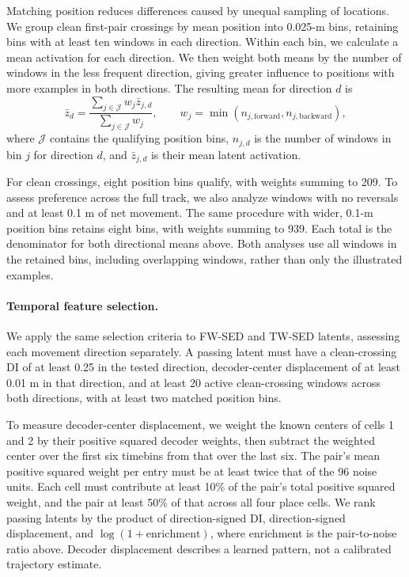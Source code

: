 Matching position reduces differences caused by unequal sampling of locations. We group clean first-pair crossings by mean position into 0.025-m bins, retaining bins with at least ten windows in each direction. Within each bin, we calculate a mean activation for each direction. We then weight both means by the number of windows in the less frequent direction, giving greater influence to positions with more examples in both directions. The resulting mean for direction $d$ is
\begin{equation}
\bar z_d=\frac{\sum_{j\in\mathcal{J}}w_j\bar z_{j,d}}{\sum_{j\in\mathcal{J}}w_j},
\qquad w_j=\min(n_{j,\mathrm{forward}},n_{j,\mathrm{backward}}),
\end{equation}
where $\mathcal{J}$ contains the qualifying position bins, $n_{j,d}$ is the number of windows in bin $j$ for direction $d$, and $\bar z_{j,d}$ is their mean latent activation.

For clean crossings, eight position bins qualify, with weights summing to 209. To assess preference across the full track, we also analyze windows with no reversals and at least 0.1 m of net movement. The same procedure with wider, 0.1-m position bins retains eight bins, with weights summing to 939. Each total is the denominator for both directional means above. Both analyses use all windows in the retained bins, including overlapping windows, rather than only the illustrated examples.

\paragraph{Temporal feature selection.}
We apply the same selection criteria to FW-SED and TW-SED latents, assessing each movement direction separately. A passing latent must have a clean-crossing DI of at least 0.25 in the tested direction, decoder-center displacement of at least 0.01 m in that direction, and at least 20 active clean-crossing windows across both directions, with at least two matched position bins.

To measure decoder-center displacement, we weight the known centers of cells 1 and 2 by their positive squared decoder weights, then subtract the weighted center over the first six timebins from that over the last six. The pair's mean positive squared weight per entry must be at least twice that of the 96 noise units. Each cell must contribute at least 10\% of the pair's total positive squared weight, and the pair at least 50\% of that across all four place cells. We rank passing latents by the product of direction-signed DI, direction-signed displacement, and $\log(1+\mathrm{enrichment})$, where enrichment is the pair-to-noise ratio above. Decoder displacement describes a learned pattern, not a calibrated trajectory estimate.

